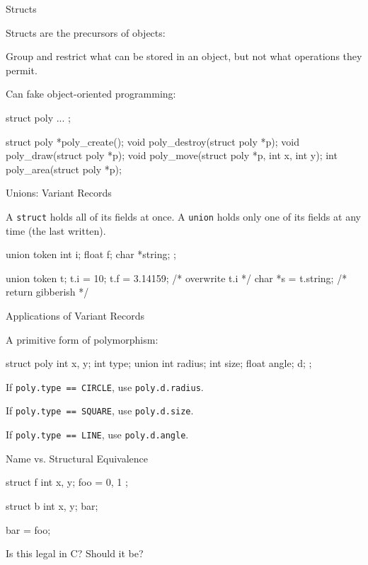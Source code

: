 \documentclass{plt}
\begin{document}
\begin{frame}[fragile]{Structs}

Structs are the precursors of objects:

Group and restrict what can be stored in an object, but not what
operations they permit.

Can fake object-oriented programming:

\begin{C}
struct poly { ... };

struct poly *poly_create();
void         poly_destroy(struct poly *p);
void         poly_draw(struct poly *p);
void         poly_move(struct poly *p, int x, int y);
int          poly_area(struct poly *p);
\end{C}

\end{frame}

\begin{frame}[fragile]{Unions: Variant Records}

A \texttt{struct} holds all of its fields at once.  A \texttt{union}
holds only one of its fields at any time (the last written).

\begin{C}
union token {
  int i;
  float f;
  char *string;
};

union token t;
t.i = 10;
t.f = 3.14159;       /* overwrite t.i */
char *s = t.string;  /* return gibberish */
\end{C}

\end{frame}


\begin{frame}[fragile]{Applications of Variant Records}

A primitive form of polymorphism:

\begin{C}
struct poly {
  int x, y;
  int type;
  union { int radius;
          int size;
          float angle; } d;
};
\end{C}

If \verb|poly.type == CIRCLE|, use \verb|poly.d.radius|.

If \verb|poly.type == SQUARE|, use \verb|poly.d.size|.

If \verb|poly.type == LINE|, use \verb|poly.d.angle|.

\end{frame}

\begin{frame}[fragile]{Name vs. Structural Equivalence}

\begin{C}
struct f {
  int x, y;
} foo = { 0, 1 };

struct b {
  int x, y;
} bar;

bar = foo;
\end{C}

Is this legal in C?  Should it be?


\end{frame}
\end{document}
